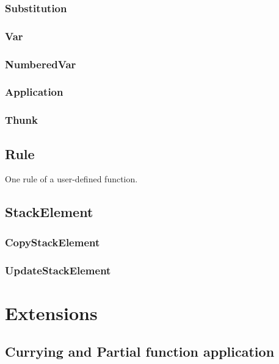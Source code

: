 \subsubsection*{Substitution}

\subsubsection*{Var}

\subsubsection*{NumberedVar}

\subsubsection*{Application}

\subsubsection*{Thunk}

\subsection*{Rule}

One rule of a user-defined function.

\subsection*{StackElement}

\subsubsection*{CopyStackElement}

\subsubsection*{UpdateStackElement}



\section{Extensions}


\subsection{Currying and Partial function application}



